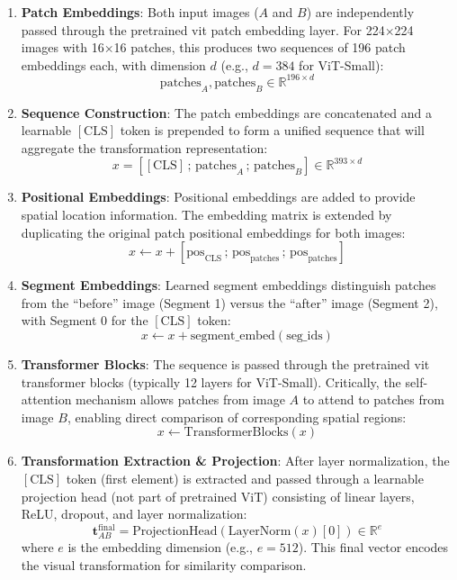 \documentclass[twocolumn]{article} %
\begin{document}
\begin{enumerate}
\item \textbf{Patch Embeddings}: Both input images ($A$ and $B$) are independently passed through the pretrained \gls{vit} patch embedding layer. For 224$\times$224 images with 16$\times$16 patches, this produces two sequences of 196 patch embeddings each, with dimension $d$ (e.g., $d=384$ for ViT-Small):
\[
\text{patches}_A, \text{patches}_B \in \mathbb{R}^{196 \times d}
\]

\item \textbf{Sequence Construction}: The patch embeddings are concatenated and a learnable $[\text{CLS}]$ token is prepended to form a unified sequence that will aggregate the transformation representation:
\[
x = [[\text{CLS}] \,;\, \text{patches}_A \,;\, \text{patches}_B] \in \mathbb{R}^{393 \times d}
\]

\item \textbf{Positional Embeddings}: Positional embeddings are added to provide spatial location information. The embedding matrix is extended by duplicating the original patch positional embeddings for both images:
\[
x \leftarrow x + [\text{pos}_{\text{CLS}} \,;\, \text{pos}_{\text{patches}} \,;\, \text{pos}_{\text{patches}}]
\]

\item \textbf{Segment Embeddings}: Learned segment embeddings distinguish patches from the ``before'' image (Segment 1) versus the ``after'' image (Segment 2), with Segment 0 for the $[\text{CLS}]$ token:
\[
x \leftarrow x + \text{segment\_embed}(\text{seg\_ids})
\]

\item \textbf{Transformer Blocks}: The sequence is passed through the pretrained \gls{vit} transformer blocks (typically 12 layers for ViT-Small). Critically, the self-attention mechanism allows patches from image $A$ to attend to patches from image $B$, enabling direct comparison of corresponding spatial regions:
\[
x \leftarrow \text{TransformerBlocks}(x)
\]

\item \textbf{Transformation Extraction \& Projection}: After layer normalization, the $[\text{CLS}]$ token (first element) is extracted and passed through a learnable projection head (not part of pretrained ViT) consisting of linear layers, ReLU, dropout, and layer normalization:
\[
\mathbf{t}_{AB}^{\text{final}} = \text{ProjectionHead}(\text{LayerNorm}(x)[0]) \in \mathbb{R}^{e}
\]
where $e$ is the embedding dimension (e.g., $e=512$). This final vector encodes the visual transformation for similarity comparison.
\end{enumerate}
\end{document}
